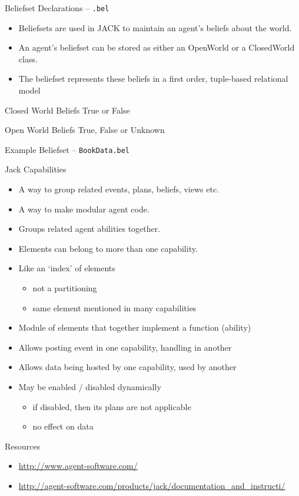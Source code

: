 \documentclass[aspectratio=1610,xcolor=dvipsnames,t]{beamer}
\newcommand{\showcode}[1]{\begin{mdframed}[style=code] %
                          \end{mdframed}%
}
\begin{document}
\begin{frame}{Beliefset Declarations -- \texttt{.bel}}
    \begin{itemize}
        \item Beliefsets are used in JACK to maintain an agent's 
              beliefs about the world.
        \item An agent's beliefset can be stored as either an 
              OpenWorld or a ClosedWorld class. 
        \item The beliefset represents these beliefs in a first order, 
              tuple-based relational model 
    \end{itemize} 
    \begin{block}{Closed World Beliefs}
        True or False
    \end{block} 
    \begin{block}{Open World Beliefs}
        True, False or Unknown
    \end{block} 
\end{frame} 

\begin{frame}{Example Beliefset -- \texttt{BookData.bel}}
    \showcode{bookbelief.java} 
\end{frame} 

\begin{frame}{Jack Capabilities}
    \begin{itemize}
        \item A way to group related events, plans, beliefs, views etc.
        \item A way to make modular agent code.
        \item Groups related agent abilities together.
        \item Elements can belong to more than one capability.
        \item Like an ‘index’ of elements
            \begin{itemize}
                \item not a partitioning
                \item same element mentioned in many capabilities
            \end{itemize} 
        \item Module of elements that together implement a function (ability)
        \item Allows posting event in one capability, handling in another
        \item Allows data being hosted by one capability, used by another
        \item May be enabled / disabled dynamically
            \begin{itemize}
                \item if disabled, then its plans are not applicable
                \item no effect on data
            \end{itemize} 
    \end{itemize} 
\end{frame} 

\begin{frame}{Resources}
    \begin{itemize}
        \item \url{http://www.agent-software.com/}
        \item
            \url{http://agent-software.com/products/jack/documentation\_and\_instructi/}
    \end{itemize}
\end{frame} 
\end{document}
